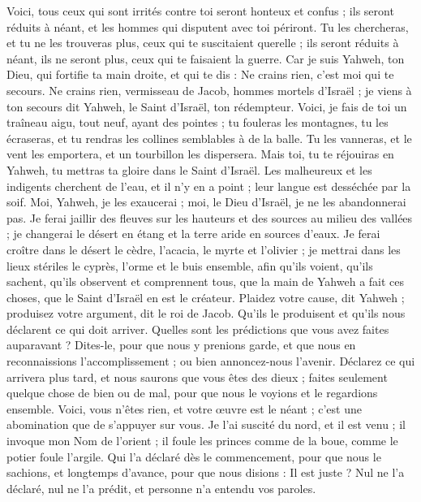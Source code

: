 \begin{multicols}{2}
Voici, tous ceux qui sont irrités contre toi seront honteux et confus ; ils seront réduits à néant, et les hommes qui disputent avec toi périront.
Tu les chercheras, et tu ne les trouveras plus, ceux qui te suscitaient querelle ; ils seront réduits à néant, ils ne seront plus, ceux qui te faisaient la guerre.
Car je suis Yahweh, ton Dieu, qui fortifie ta main droite, et qui te dis : Ne crains rien, c'est moi qui te secours.
Ne crains rien, vermisseau de Jacob, hommes mortels d'Israël ; je viens à ton secours dit Yahweh, le Saint d'Israël, ton rédempteur.
Voici, je fais de toi un traîneau aigu, tout neuf, ayant des pointes ; tu fouleras les montagnes, tu les écraseras, et tu rendras les collines semblables à de la balle.
Tu les vanneras, et le vent les emportera, et un tourbillon les dispersera. Mais toi, tu te réjouiras en Yahweh, tu mettras ta gloire dans le Saint d'Israël.
Les malheureux et les indigents cherchent de l'eau, et il n'y en a point ; leur langue est desséchée par la soif. Moi, Yahweh, je les exaucerai ; moi, le Dieu d'Israël, je ne les abandonnerai pas.
Je ferai jaillir des fleuves sur les hauteurs et des sources au milieu des vallées ; je changerai le désert en étang et la terre aride en sources d'eaux.
Je ferai croître dans le désert le cèdre, l'acacia, le myrte et l'olivier ; je mettrai dans les lieux stériles le cyprès, l'orme et le buis ensemble,
afin qu'ils voient, qu'ils sachent, qu'ils observent et comprennent tous, que la main de Yahweh a fait ces choses, que le Saint d'Israël en est le créateur.
Plaidez votre cause, dit Yahweh ; produisez votre argument, dit le roi de Jacob.
Qu'ils le produisent et qu'ils nous déclarent ce qui doit arriver. Quelles sont les prédictions que vous avez faites auparavant ? Dites-le, pour que nous y prenions garde, et que nous en reconnaissions l'accomplissement ; ou bien annoncez-nous l'avenir.
Déclarez ce qui arrivera plus tard, et nous saurons que vous êtes des dieux ; faites seulement quelque chose de bien ou de mal, pour que nous le voyions et le regardions ensemble.
Voici, vous n'êtes rien, et votre œuvre est le néant ; c'est une abomination que de s'appuyer sur vous.
Je l'ai suscité du nord, et il est venu ; il invoque mon Nom de l'orient ; il foule les princes comme de la boue, comme le potier foule l'argile.
Qui l'a déclaré dès le commencement, pour que nous le sachions, et longtemps d'avance, pour que nous disions : Il est juste ? Nul ne l'a déclaré, nul ne l'a prédit, et personne n'a entendu vos paroles.

\end{multicols}
